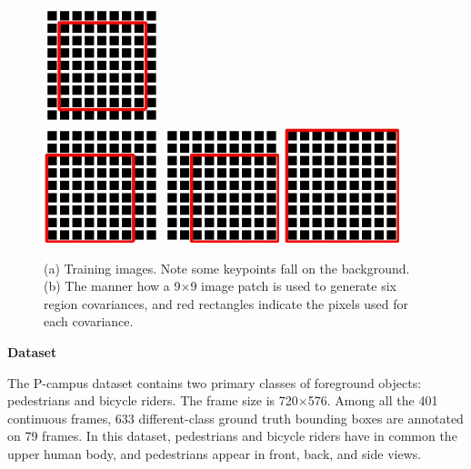 \begin{figure}
{{\begin{minipage}[b]{0.4\textwidth}
\includegraphics[width=0.3\textwidth,bb=0 0 149 149]{dst5.jpg}  \\
\includegraphics[width=0.3\textwidth,bb=0 0 149 149]{dst2.jpg}
\includegraphics[width=0.3\textwidth,bb=0 0 149 149]{dst4.jpg}
\includegraphics[width=0.3\textwidth,bb=0 0 149 149]{dst1.jpg}
\end{minipage}
}
\label{fig:train:b}
}
\caption[Images for training]{(a) Training images. Note some keypoints fall on the background. (b) The manner how a 9$\times$9 image patch is used to generate six region covariances, and red rectangles indicate the pixels used for each covariance.}
\label{fig:train}
\end{figure}

\textbf{Dataset}

 The P-campus dataset contains two primary classes of foreground objects: pedestrians and bicycle riders. The frame size is 720$\times$576. Among all the 401 continuous frames, 633 different-class ground truth bounding boxes are annotated on 79 frames. In this dataset, pedestrians and bicycle riders have in common the upper human body, and pedestrians appear in front, back, and side views.


